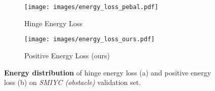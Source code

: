 \documentclass[10pt,twocolumn,letterpaper]{article}
\begin{document}
\begin{figure}[t!]
    \centering
    \vspace{-2pt}
    \begin{subfigure}[b]{0.495\linewidth}
         \centering    
            \texttt{[image: images/energy\_loss\_pebal.pdf]}
        \caption{Hinge Energy Loss~\cite{liu2020energy}}
         \label{fig:hg_loss}
         \vspace{-7pt}
    \end{subfigure}
    \begin{subfigure}[b]{0.495\linewidth}
        \centering    
            \texttt{[image: images/energy\_loss\_ours.pdf]}
        \caption{Positive Energy Loss (ours)}
         \label{fig:pe_loss}
         \vspace{-7pt}
     \end{subfigure}
     \caption{\textbf{Energy distribution} of hinge energy loss (a) and positive energy loss (b) on
\textit{SMIYC (obstacle)} validation set. }
    \vspace{-12 pt}
     \label{fig:dist-diff}
\end{figure}
\end{document}
